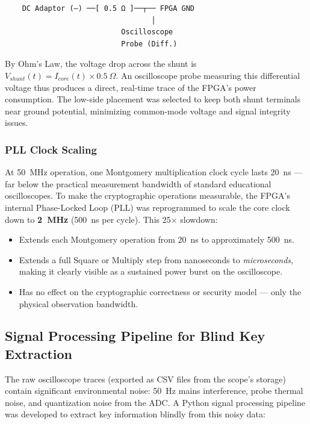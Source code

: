 \documentclass[conference, a4paper]{IEEEtran}
\begin{document}
\begin{verbatim}
    DC Adaptor (–) ──[ 0.5 Ω ]──┬── FPGA GND
                                  │
                           Oscilloscope
                           Probe (Diff.)
\end{verbatim}

By Ohm's Law, the voltage drop across the shunt is $V_{shunt}(t) = I_{core}(t) \times 0.5~\Omega$. An oscilloscope probe measuring this differential voltage thus produces a direct, real-time trace of the FPGA's power consumption. The low-side placement was selected to keep both shunt terminals near ground potential, minimizing common-mode voltage and signal integrity issues.

\subsubsection*{PLL Clock Scaling}
At 50~MHz operation, one Montgomery multiplication clock cycle lasts 20~ns — far below the practical measurement bandwidth of standard educational oscilloscopes. To make the cryptographic operations measurable, the FPGA's internal Phase-Locked Loop (PLL) was reprogrammed to scale the core clock down to \textbf{2~MHz} (500~ns per cycle). This 25$\times$ slowdown:
\begin{itemize}
    \item Extends each Montgomery operation from 20~ns to approximately 500~ns.
    \item Extends a full Square or Multiply step from nanoseconds to \textit{microseconds}, making it clearly visible as a sustained power burst on the oscilloscope.
    \item Has no effect on the cryptographic correctness or security model — only the physical observation bandwidth.
\end{itemize}

\subsection{Signal Processing Pipeline for Blind Key Extraction}

The raw oscilloscope traces (exported as CSV files from the scope's storage) contain significant environmental noise: 50~Hz mains interference, probe thermal noise, and quantization noise from the ADC. A Python signal processing pipeline was developed to extract key information blindly from this noisy data:
\end{document}
